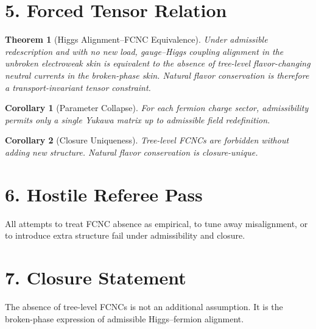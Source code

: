 ﻿\documentclass[11pt]{article}
\newtheorem{theorem}{Theorem}
\newtheorem{corollary}{Corollary}
\begin{document}
\section*{5. Forced Tensor Relation}
\begin{theorem}[Higgs Alignment--FCNC Equivalence]
Under admissible redescription and with no new load,
gauge--Higgs coupling alignment in the unbroken electroweak skin is equivalent to the absence of tree-level flavor-changing neutral currents in the broken-phase skin.
Natural flavor conservation is therefore a transport-invariant tensor constraint.
\end{theorem}

\begin{corollary}[Parameter Collapse]
For each fermion charge sector, admissibility permits only a single Yukawa matrix up to admissible field redefinition.
\end{corollary}

\begin{corollary}[Closure Uniqueness]
Tree-level FCNCs are forbidden without adding new structure.
Natural flavor conservation is closure-unique.
\end{corollary}

\section*{6. Hostile Referee Pass}
All attempts to treat FCNC absence as empirical,
to tune away misalignment,
or to introduce extra structure fail under admissibility and closure.

\section*{7. Closure Statement}
The absence of tree-level FCNCs is not an additional assumption.
It is the broken-phase expression of admissible Higgs--fermion alignment.
\end{document}
